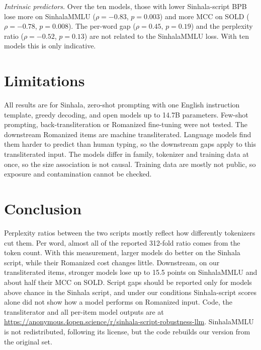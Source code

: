 \documentclass[3p,times,procedia]{elsarticle}
\newcommand{\anonrepo}{\url{https://anonymous.4open.science/r/sinhala-script-robustness-llm}}
\begin{document}
\textit{Intrinsic predictors.} Over the ten models, those with lower Sinhala-script BPB lose more on SinhalaMMLU ($\rho = -0.83$, $p = 0.003$) and more MCC on SOLD ($\rho = -0.78$, $p = 0.008$). The per-word gap ($\rho = 0.45$, $p = 0.19$) and the perplexity ratio ($\rho = -0.52$, $p = 0.13$) are not related to the SinhalaMMLU loss. With ten models this is only indicative.

\section{Limitations}

All results are for Sinhala, zero-shot prompting with one English instruction template, greedy decoding, and open models up to 14.7B parameters. Few-shot prompting, back-transliteration or Romanized fine-tuning were not tested. The downstream Romanized items are machine transliterated. Language models find them harder to predict than human typing, so the downstream gaps apply to this transliterated input. The models differ in family, tokenizer and training data at once, so the size association is not causal. Training data are mostly not public, so exposure and contamination cannot be checked.

\section{Conclusion}

Perplexity ratios between the two scripts mostly reflect how differently tokenizers cut them. Per word, almost all of the reported 312-fold ratio comes from the token count. With this measurement, larger models do better on the Sinhala script, while their Romanized cost changes little. Downstream, on our transliterated items, stronger models lose up to 15.5 points on SinhalaMMLU and about half their MCC on SOLD. Script gaps should be reported only for models above chance in the Sinhala script, and under our conditions Sinhala-script scores alone did not show how a model performs on Romanized input. Code, the transliterator and all per-item model outputs are at \anonrepo. SinhalaMMLU is not redistributed, following its license, but the code rebuilds our version from the original set.
\end{document}

